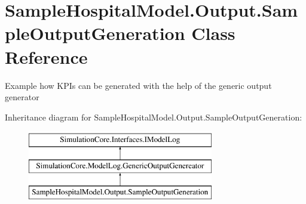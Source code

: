 \hypertarget{class_sample_hospital_model_1_1_output_1_1_sample_output_generation}{}\section{Sample\+Hospital\+Model.\+Output.\+Sample\+Output\+Generation Class Reference}
\label{class_sample_hospital_model_1_1_output_1_1_sample_output_generation}


Example how K\+P\+Is can be generated with the help of the generic output generator  


Inheritance diagram for Sample\+Hospital\+Model.\+Output.\+Sample\+Output\+Generation\+:\begin{figure}[H]
\begin{center}
\leavevmode
\includegraphics[height=3.000000cm]{class_sample_hospital_model_1_1_output_1_1_sample_output_generation}
\end{center}
\end{figure}

